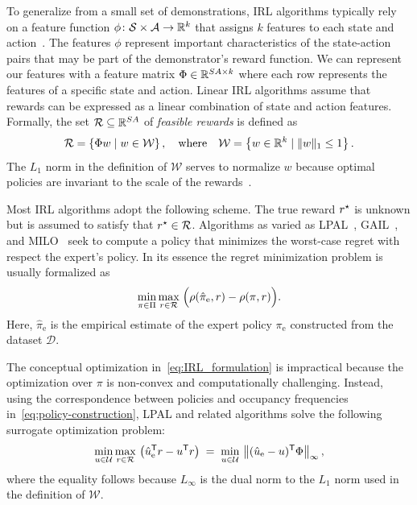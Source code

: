 To generalize from a small set of demonstrations, IRL algorithms typically rely on a feature function $\phi\colon \mathcal{S} \times \mathcal{A}\to \mathbb{R}^k$ that assigns $k$ features to each state and action~\cite{abbeel2004,Syed2008,Brown2018a,lacotte2019,chang2021mitigating,jonnavittula2021know,arora2021survey}. The features $\phi$ represent important characteristics of the state-action pairs that may be part of the demonstrator's reward function. We can represent our features with a feature matrix $\Phi \in \mathbb{R}^{SA\times k}$ where each row represents the features of a specific state and action. Linear IRL algorithms assume that rewards can be expressed as a linear combination of state and action features. Formally, the set $\mathcal{R} \subseteq \mathbb{R}^{SA}$ of \emph{feasible rewards} is defined as
\begin{equation} \label{eq:r-defintion}
  \mathcal{R} = \left\{ \Phi w \mid  w\in \mathcal{W} \right\}, \quad
  \text{where} \quad
  \mathcal{W} = \left\{ w \in \mathbb{R}^k \mid \| w \|_1 \le 1 \right\}. 
\end{equation}
The $L_1$ norm in the definition of $\mathcal{W}$ serves to normalize $w$ because optimal policies are invariant to the scale of the rewards~\cite{abbeel2004,Syed2008}. 

Most IRL algorithms adopt the following scheme. The true reward $r^{\star}$ is unknown but is assumed to satisfy that $r^{\star} \in \mathcal{R}$. Algorithms as varied as LPAL~\cite{Syed2008}, GAIL~\cite{Ho2016}, and MILO~\cite{chang2021mitigating} seek to compute a policy that minimizes the worst-case regret with respect the expert's policy. In its essence the regret minimization problem is usually formalized as
\begin{equation} \label{eq:IRL_formulation}
\min_{\pi \in \Pi} \max_{r \in \mathcal{R}} \; \Bigl( \rho(\hat{\pi}_{\mathrm{e}}, r) - \rho(\pi, r) \Bigr).
\end{equation}
Here, $\hat{\pi}_{\mathrm{e}}$ is the empirical estimate of the expert policy $\pi_{\mathrm{e}}$ constructed from the dataset $\mathcal{D}$.

The conceptual optimization in~\eqref{eq:IRL_formulation} is impractical because the optimization over $\pi$ is non-convex and computationally challenging. Instead, using the correspondence between policies and occupancy frequencies in~\eqref{eq:policy-construction}, LPAL and related algorithms solve the following surrogate optimization problem:
\begin{equation} \label{eq:irl-formulation-u}
  \min_{u\in \mathcal{U}} \max_{r\in \mathcal{R}} \, \left(\hat{u}_{\mathrm{e}}^{\mathsf{T}} r - u^{\mathsf{T}} r \right)
  \; =\; 
  \min_{u\in \mathcal{U}} \, \left\| (\hat{u}_{\mathrm{e}} - u)^{\mathsf{T}} \Phi \right\|_{\infty},
\end{equation}
where the equality follows because $L_{\infty}$ is the dual norm to the $L_1$ norm used in the definition of $\mathcal{W}$.

